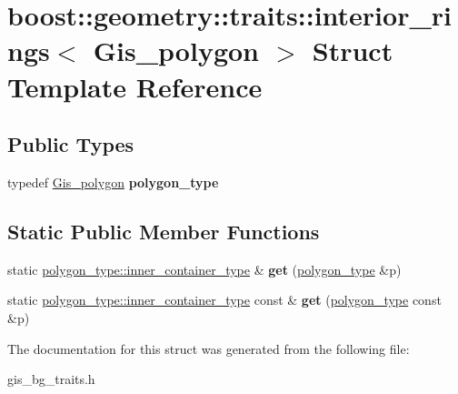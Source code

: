 \hypertarget{structboost_1_1geometry_1_1traits_1_1interior__rings_3_01Gis__polygon_01_4}{}\section{boost\+:\+:geometry\+:\+:traits\+:\+:interior\+\_\+rings$<$ Gis\+\_\+polygon $>$ Struct Template Reference}
\label{structboost_1_1geometry_1_1traits_1_1interior__rings_3_01Gis__polygon_01_4}
\subsection*{Public Types}
\begin{DoxyCompactItemize}
\item 
\mbox{\label{structboost_1_1geometry_1_1traits_1_1interior__rings_3_01Gis__polygon_01_4_aacd0644ad40b0fc0204dd910c67e4834}} 
typedef \mbox{\hyperlink{classGis__polygon}{Gis\+\_\+polygon}} {\bfseries polygon\+\_\+type}
\end{DoxyCompactItemize}
\subsection*{Static Public Member Functions}
\begin{DoxyCompactItemize}
\item 
\mbox{\label{structboost_1_1geometry_1_1traits_1_1interior__rings_3_01Gis__polygon_01_4_a32a20e6ee8cfd73aaef57554c82c50f4}} 
static \mbox{\hyperlink{classGis__wkb__vector}{polygon\+\_\+type\+::inner\+\_\+container\+\_\+type}} \& {\bfseries get} (\mbox{\hyperlink{classGis__polygon}{polygon\+\_\+type}} \&p)
\item 
\mbox{\label{structboost_1_1geometry_1_1traits_1_1interior__rings_3_01Gis__polygon_01_4_ac1b49debe5bedde0c88355a85dd76da2}} 
static \mbox{\hyperlink{classGis__wkb__vector}{polygon\+\_\+type\+::inner\+\_\+container\+\_\+type}} const  \& {\bfseries get} (\mbox{\hyperlink{classGis__polygon}{polygon\+\_\+type}} const \&p)
\end{DoxyCompactItemize}


The documentation for this struct was generated from the following file\+:\begin{DoxyCompactItemize}
\item 
gis\+\_\+bg\+\_\+traits.\+h\end{DoxyCompactItemize}
